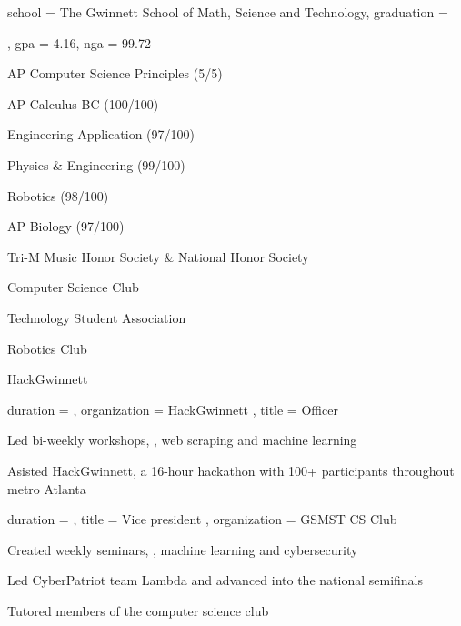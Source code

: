 \documentclass[sidebar-width=2.25in, primary=slate]{clean-resume}
\begin{document}
  \begin{main}
    
    \education
    {
      school = {The Gwinnett School of Math, Science and Technology},
      graduation = {\date{2025/5}},
      gpa = 4.16,
      nga = 99.72
    }
  
    \begin{lst}
      [
        title = {Relevant Coursework},
        columns = 2,
    	]
      \item AP Computer Science Principles (5/5)
      \item AP Calculus BC (100/100)
      \item Engineering Application (97/100)
      \item Physics \& Engineering (99/100)
      \item Robotics (98/100)
      \item AP Biology (97/100)
    \end{lst}
    
    \begin{lst}
      [
        title = Honors,
        oneline = true,
      ]
      Tri-M Music Honor Society \& National Honor Society
    \end{lst}
    
    \begin{lst}
      [
        title = Clubs,
        columns = 2,
  	]
      \item Computer Science Club
      \item Technology Student Association
      \item Robotics Club
      \item HackGwinnett
    \end{lst}
    
    
    \begin{experience}
      {
        duration = {  },
        organization = { HackGwinnett },
        title = { Officer }
      }
      \item Led bi-weekly workshops, \eg, web scraping and machine learning
      \item Asisted HackGwinnett, a 16-hour hackathon with 100+ participants   throughout metro Atlanta
    \end{experience}
    
    \begin{experience}
      {
        duration = {  },
        title = { Vice president },
        organization = { GSMST CS Club }
      }
      \item Created weekly seminars, \eg, machine learning and cybersecurity
      \item Led CyberPatriot team Lambda and advanced into the national semifinals
      \item Tutored members of the computer science club
      

\end{experience}
\end{main}
\end{document}

